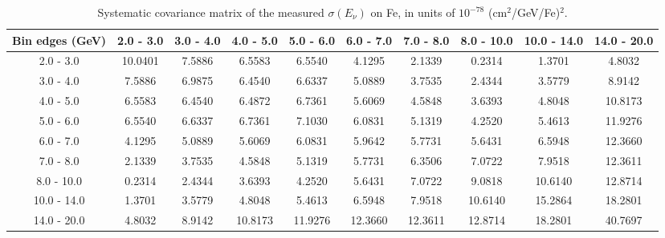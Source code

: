\documentclass[aps,prl,twocolumn,superscriptaddress,nofootinbib]{revtex4-1}
\begin{document}
\begin{table}[h!]
  \centering
  \caption{Systematic covariance matrix of the measured $\sigma(E_{\nu})$ on Fe, in units of $10^{-78}$ (cm$^{2}$/GeV/Fe)$^{2}$.}
    \begin{tabular}{c||ccccccccc}
      Bin edges (GeV) & 2.0 - 3.0 & 3.0 - 4.0 & 4.0 - 5.0 & 5.0 - 6.0 & 6.0 - 7.0 & 7.0 - 8.0 & 8.0 - 10.0 & 10.0 - 14.0 & 14.0 - 20.0 \\
\hline \hline
        2.0 - 3.0 & 10.0401 &  7.5886 &  6.5583 &  6.5540 &  4.1295 &  2.1339 &  0.2314 &  1.3701 &  4.8032 \\
        3.0 - 4.0 &  7.5886 &  6.9875 &  6.4540 &  6.6337 &  5.0889 &  3.7535 &  2.4344 &  3.5779 &  8.9142 \\
        4.0 - 5.0 &  6.5583 &  6.4540 &  6.4872 &  6.7361 &  5.6069 &  4.5848 &  3.6393 &  4.8048 & 10.8173 \\
        5.0 - 6.0 &  6.5540 &  6.6337 &  6.7361 &  7.1030 &  6.0831 &  5.1319 &  4.2520 &  5.4613 & 11.9276 \\
        6.0 - 7.0 &  4.1295 &  5.0889 &  5.6069 &  6.0831 &  5.9642 &  5.7731 &  5.6431 &  6.5948 & 12.3660 \\
        7.0 - 8.0 &  2.1339 &  3.7535 &  4.5848 &  5.1319 &  5.7731 &  6.3506 &  7.0722 &  7.9518 & 12.3611 \\
       8.0 - 10.0 &  0.2314 &  2.4344 &  3.6393 &  4.2520 &  5.6431 &  7.0722 &  9.0818 & 10.6140 & 12.8714 \\
      10.0 - 14.0 &  1.3701 &  3.5779 &  4.8048 &  5.4613 &  6.5948 &  7.9518 & 10.6140 & 15.2864 & 18.2801 \\
      14.0 - 20.0 &  4.8032 &  8.9142 & 10.8173 & 11.9276 & 12.3660 & 12.3611 & 12.8714 & 18.2801 & 40.7697 \\
    \end{tabular}
  \label{tablecov:Fe_Systematic_Enu}
\end{table}
\end{document}
